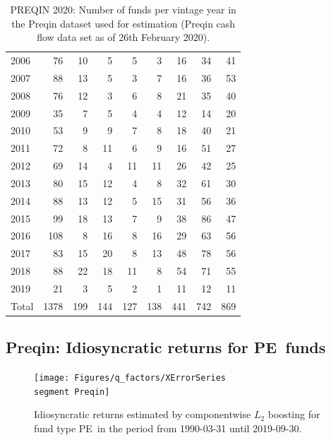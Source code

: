 \begin{table}[ht]
\begin{tabular}{lrrrrrrrr}
		2006 &  76 &  10 &   5 &   5 &   3 &  16 &  34 &  41 \\ 
		2007 &  88 &  13 &   5 &   3 &   7 &  16 &  36 &  53 \\ 
		2008 &  76 &  12 &   3 &   6 &   8 &  21 &  35 &  40 \\ 
		2009 &  35 &   7 &   5 &   4 &   4 &  12 &  14 &  20 \\ 
		2010 &  53 &   9 &   9 &   7 &   8 &  18 &  40 &  21 \\ 
		2011 &  72 &   8 &  11 &   6 &   9 &  16 &  51 &  27 \\ 
		2012 &  69 &  14 &   4 &  11 &  11 &  26 &  42 &  25 \\ 
		2013 &  80 &  15 &  12 &   4 &   8 &  32 &  61 &  30 \\ 
		2014 &  88 &  13 &  12 &   5 &  15 &  31 &  56 &  36 \\ 
		2015 &  99 &  18 &  13 &   7 &   9 &  38 &  86 &  47 \\ 
		2016 & 108 &   8 &  16 &   8 &  16 &  29 &  63 &  56 \\ 
		2017 &  83 &  15 &  20 &   8 &  13 &  48 &  78 &  56 \\ 
		2018 &  88 &  22 &  18 &  11 &   8 &  54 &  71 &  55 \\ 
		2019 &  21 &   3 &   5 &   2 &   1 &  11 &  12 &  11 \\ 
		\hline
		Total & 1378 & 199 & 144 & 127 & 138 & 441 & 742 & 869 \\ 
		\hline
		\hline
	\end{tabular}
	\caption{PREQIN 2020: Number of funds per vintage year in the Preqin dataset used for estimation (Preqin cash flow data set as of 26th February 2020).} 
	\label{tab:preqin_data}
\end{table}


\newpage


\renewcommand{\segment}{PE}

\subsection{Preqin: Idiosyncratic returns for \segment \ funds}
\label{sec:preqin_errors_\segment}

\begin{figure}[H]
	\centering
	\texttt{[image: Figures/q\_factors/XErrorSeries\\segment Preqin]}
	\caption{Idiosyncratic returns estimated by componentwise $L_2$ boosting for fund type \segment \ in the period from 1990-03-31 until 2019-09-30.}
	\label{fig:preqin_clb_idio_\segment}
\end{figure}

